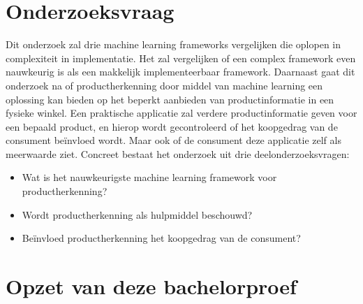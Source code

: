 \section{Onderzoeksvraag}
\label{sec:onderzoeksvraag}

Dit onderzoek zal drie machine learning frameworks vergelijken die oplopen in complexiteit in implementatie. Het zal vergelijken of een complex framework even nauwkeurig is als een makkelijk implementeerbaar framework. Daarnaast gaat dit onderzoek na of productherkenning door middel van machine learning een oplossing kan bieden op het beperkt aanbieden van productinformatie in een fysieke winkel. Een praktische applicatie zal verdere productinformatie geven voor een bepaald product, en hierop wordt gecontroleerd of het koopgedrag van de consument beïnvloed wordt. Maar ook of de consument deze applicatie zelf als meerwaarde ziet. Concreet bestaat het onderzoek uit drie deelonderzoeksvragen:
\begin{itemize}
  \item Wat is het nauwkeurigste machine learning framework voor productherkenning?
  \item Wordt productherkenning als hulpmiddel beschouwd?
  \item Beïnvloed productherkenning het koopgedrag van de consument?
\end{itemize}


\section{Opzet van deze bachelorproef}
\label{sec:opzet-bachelorproef}




